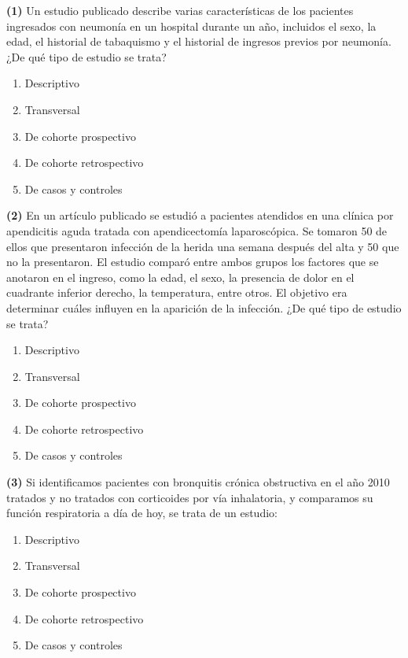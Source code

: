 \documentclass[
]{book}
\providecommand{\tightlist}{%
  \setlength{\itemsep}{0pt}\setlength{\parskip}{0pt}}
\theoremstyle{definition}
\theoremstyle{definition}
\theoremstyle{definition}
\theoremstyle{definition}
\theoremstyle{remark}
\begin{document}
\textbf{(1)} Un estudio publicado describe varias características de los pacientes ingresados con neumonía en un hospital durante un año, incluidos el sexo, la edad, el historial de tabaquismo y el historial de ingresos previos por neumonía. ¿De qué tipo de estudio se trata?

\begin{enumerate}
\def\labelenumi{\arabic{enumi}.}
\tightlist
\item
  Descriptivo
\item
  Transversal
\item
  De cohorte prospectivo
\item
  De cohorte retrospectivo
\item
  De casos y controles
\end{enumerate}

\textbf{(2)} En un artículo publicado se estudió a pacientes atendidos en una clínica por apendicitis aguda tratada con apendicectomía laparoscópica.
Se tomaron 50 de ellos que presentaron infección de la herida una semana después del alta y 50 que no la presentaron. El estudio comparó entre ambos grupos los factores que se anotaron en el ingreso, como la edad, el sexo, la presencia de dolor en el cuadrante inferior derecho, la temperatura, entre otros. El objetivo era determinar cuáles influyen en la aparición de la infección. ¿De qué tipo de estudio se trata?

\begin{enumerate}
\def\labelenumi{\arabic{enumi}.}
\tightlist
\item
  Descriptivo
\item
  Transversal
\item
  De cohorte prospectivo
\item
  De cohorte retrospectivo
\item
  De casos y controles
\end{enumerate}

\textbf{(3)} Si identificamos pacientes con bronquitis crónica obstructiva en el año 2010 tratados y no tratados con corticoides por vía inhalatoria, y comparamos su función respiratoria a día de hoy, se trata de un estudio:

\begin{enumerate}
\def\labelenumi{\arabic{enumi}.}
\tightlist
\item
  Descriptivo
\item
  Transversal
\item
  De cohorte prospectivo
\item
  De cohorte retrospectivo
\item
  De casos y controles
\end{enumerate}
\end{document}
